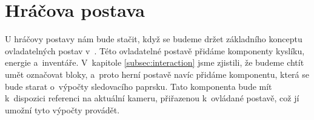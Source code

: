 
\section{Hráčova postava}
U hráčovy postavy nám bude stačit, když se budeme držet základního konceptu ovladatelných postav v~\UEu{}. Této ovladatelné postavě přidáme komponenty kyslíku, energie a~inventáře. V~kapitole \ref{subsec:interaction} jsme zjistili, že budeme chtít umět označovat bloky, a~proto herní postavě navíc přidáme komponentu, která se bude starat o~výpočty sledovacího paprsku. Tato komponenta bude mít k~dispozici referenci na aktuální kameru, přiřazenou k~ovládané postavě, což jí umožní tyto výpočty provádět.
